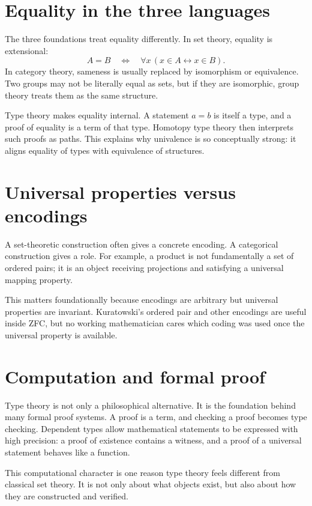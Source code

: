 \section{Equality in the three languages}

The three foundations treat equality differently.  In set theory, equality is extensional:
\[
  A=B\quad\Longleftrightarrow\quad \forall x\,(x\in A\leftrightarrow x\in B).
\]
In category theory, sameness is usually replaced by isomorphism or equivalence.  Two groups may not be literally equal as sets, but if they are isomorphic, group theory treats them as the same structure.

Type theory makes equality internal.  A statement \(a=b\) is itself a type, and a proof of equality is a term of that type.  Homotopy type theory then interprets such proofs as paths.  This explains why univalence is so conceptually strong: it aligns equality of types with equivalence of structures.

\section{Universal properties versus encodings}

A set-theoretic construction often gives a concrete encoding.  A categorical construction gives a role.  For example, a product is not fundamentally a set of ordered pairs; it is an object receiving projections and satisfying a universal mapping property.

This matters foundationally because encodings are arbitrary but universal properties are invariant.  Kuratowski's ordered pair and other encodings are useful inside ZFC, but no working mathematician cares which coding was used once the universal property is available.

\section{Computation and formal proof}

Type theory is not only a philosophical alternative.  It is the foundation behind many formal proof systems.  A proof is a term, and checking a proof becomes type checking.  Dependent types allow mathematical statements to be expressed with high precision: a proof of existence contains a witness, and a proof of a universal statement behaves like a function.

This computational character is one reason type theory feels different from classical set theory.  It is not only about what objects exist, but also about how they are constructed and verified.
